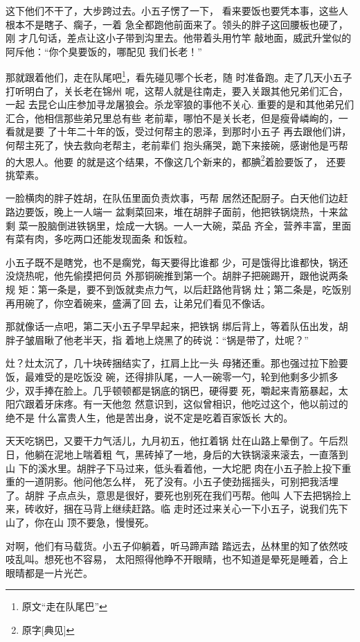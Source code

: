 这下他们不干了，大步跨过去。小五子愣了一下，
看来要饭也要凭本事，这些人根本不是瞎子、瘸子，一着
急全都跑他前面来了。领头的胖子这回腰板也硬了，刚
才几句话，差点让这小子带到沟里去。他带着头用竹竿
敲地面，威武升堂似的阿斥他：“你个臭要饭的，哪配见
我们长老！”

那就跟着他们，走在队尾吧\footnote{原文“走在队尾巴”}，看先碰见哪个长老，随
时准备跑。走了几天小五子打听明白了，关长老在锦州
呢，这帮人就是往南走，要入关跟其他兄弟们汇合，一起
去昆仑山庄参加寻龙屠狼会。杀龙宰狼的事他不关心.
重要的是和其他弟兄们汇合，他相信那些弟兄里总有些
老前辈，哪怕不是关长老，但是瘦骨嶙峋的，一看就是要
了十年二十年的饭，受过何帮主的恩泽，到那时小五子
再去跟他们讲，何帮主死了，快去救向老帮主，老前辈们
抱头痛哭，跪下来接碗，感谢他是丐帮的大恩人。他要
的就是这个结果，不像这几个新来的，都腆\footnote{原字[典见]}着脸要饭了，
还要挑荤素。

一脸横肉的胖子姓胡，在队伍里面负责炊事，丐帮
居然还配厨子。白天他们边赶路边要饭，晚上一人端一
盆剩菜回来，堆在胡胖子面前，他把铁锅烧热，十来盆剩
菜一股脑倒进铁锅里，烩成一大锅。一人一大碗，菜品
齐全，营养丰富，里面有菜有肉，多吃两口还能发现面条
和饭粒。

小五子既不是瞎党，也不是瘸党，每天要得比谁都
少，可是饿得比谁都快，锅还没烧热呢，他先偷摸把何员
外那铜碗推到第一个。胡胖子把碗踢开，跟他说两条规
矩：第一条是，要不到饭就卖点力气，以后赶路他背锅
灶；第二条是，吃饭别再用碗了，你空着碗来，盛满了回
去，让弟兄们看见不像话。

那就像话一点吧，第二天小五子早早起来，把铁锅
绑后背上，等着队伍出发，胡胖子皱眉瞅了他老半天，指
着地上烧黑了的砖说：“锅是带了，灶呢？”

灶？灶太沉了，几十块砖捆结实了，扛肩上比一头
母猪还重。那也强过拉下脸要饭，最难受的是吃饭没
碗，还得排队尾，一人一碗零一勺，轮到他剩多少抓多
少，双手捧在脸上。几乎顿顿都是锅底的锅巴，硬得要
死，嚼起来青筋暴起，太阳穴跟着牙床疼。有一天他忽
然意识到，这似曾相识，他吃过这个，他以前过的绝不是
什么富贵人生，他是苦出身，说不定是吃着百家饭长
大的。

天天吃锅巴，又要干力气活儿，九月初五，他扛着锅
灶在山路上晕倒了。午后烈日，他躺在泥地上喘着粗
气，黑砖掉了一地，身后的大铁锅滚来滚去，一直落到山
下的溪水里。胡胖子下马过来，低头看着他，一大坨肥
肉在小五子脸上投下重重的一道阴影。他问他怎么样，
死了没有。小五子使劲摇摇头，可别把我活埋了。胡胖
子点点头，意思是很好，要死也别死在我们丐帮。他叫
人下去把锅捡上来，砖收好，捆在马背上继续赶路。临
走时还过来关心一下小五子，说我们先下山了，你在山
顶不要急，慢慢死。

对啊，他们有马载货。小五子仰躺着，听马蹄声踏
踏远去，丛林里的知了依然吱吱乱叫。想死也不容易，
太阳照得他睁不开眼睛，也不知道是晕死是睡着，合上
眼晴都是一片光芒。

